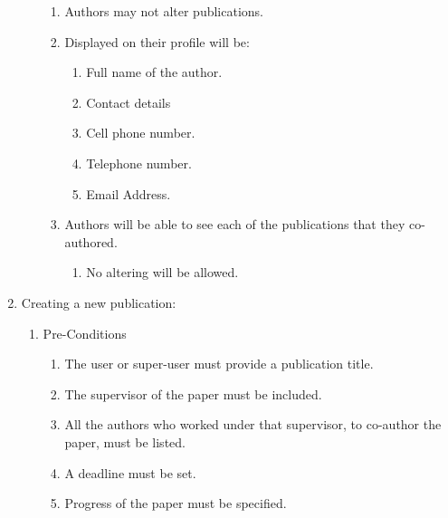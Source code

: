 \documentclass[hidelinks,a4paper,12pt]{article}
\begin{document}
\begin{enumerate}
\begin{enumerate}
			\begin{enumerate}
				\item  Authors may not alter publications.
				
				\item  Displayed on their profile will be:
				
				\begin{enumerate}
					\item  Full name of the author.
					
					\item  Contact details
					
					\item  Cell phone number.
					
					\item  Telephone number.
					
					\item  Email Address.
				\end{enumerate}
				
				\item  Authors will be able to see each of the publications that they co-authored.
				
				\begin{enumerate}
					\item  No altering will be allowed. 
				\end{enumerate}
			\end{enumerate}
		\end{enumerate}
		
		\noindent 
		
		
		\item  Creating a new publication:
		
		\begin{enumerate}
			\item  Pre-Conditions
			
			\begin{enumerate}
				\item  The user or super-user must provide a publication title.
				
				\item  The supervisor of the paper must be included.
				
				\item  All the authors who worked under that supervisor, to co-author the paper, must be listed.
				
				\item  A deadline must be set.
				
				\item  Progress of the paper must be specified.
				

\end{enumerate}
\end{enumerate}
\end{enumerate}
\end{document}
